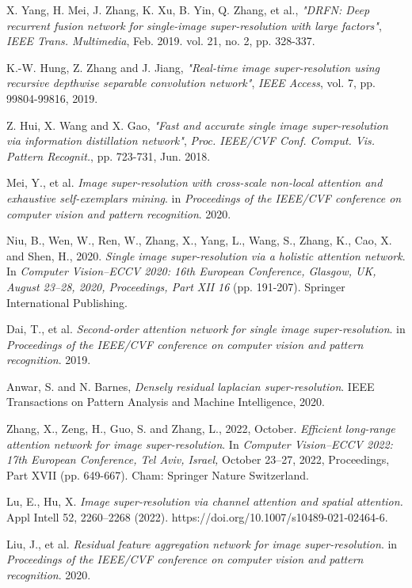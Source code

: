 \documentclass{ieeeaccess}
\begin{document}
\begin{thebibliography}{00}
 X. Yang, H. Mei, J. Zhang, K. Xu, B. Yin, Q. Zhang, et al., \textit{"DRFN: Deep recurrent fusion network for single-image super-resolution with large factors"}, \textit{IEEE Trans. Multimedia}, Feb. 2019. vol. 21, no. 2, pp. 328-337.

 K.-W. Hung, Z. Zhang and J. Jiang, \textit{"Real-time image super-resolution using recursive depthwise separable convolution network"}, \textit{IEEE Access}, vol. 7, pp. 99804-99816, 2019.

 Z. Hui, X. Wang and X. Gao, \textit{"Fast and accurate single image super-resolution via information distillation network"}, \textit{Proc. IEEE/CVF Conf. Comput. Vis. Pattern Recognit.}, pp. 723-731, Jun. 2018.

 Mei, Y., et al. \textit{Image super-resolution with cross-scale non-local attention and exhaustive self-exemplars mining}. in \textit{Proceedings of the IEEE/CVF conference on computer vision and pattern recognition}. 2020.

 Niu, B., Wen, W., Ren, W., Zhang, X., Yang, L., Wang, S., Zhang, K., Cao, X. and Shen, H., 2020. \textit{Single image super-resolution via a holistic attention network}. In \textit{Computer Vision–ECCV 2020: 16th European Conference, Glasgow, UK, August 23–28, 2020, Proceedings, Part XII 16} (pp. 191-207). Springer International Publishing.

 Dai, T., et al. \textit{Second-order attention network for single image super-resolution}. in \textit{Proceedings of the IEEE/CVF conference on computer vision and pattern recognition}. 2019.

 Anwar, S. and N. Barnes, \textit{Densely residual laplacian super-resolution}. IEEE Transactions on Pattern Analysis and Machine Intelligence, 2020.

 Zhang, X., Zeng, H., Guo, S. and Zhang, L., 2022, October. \textit{Efficient long-range attention network for image super-resolution}. In \textit{Computer Vision–ECCV 2022: 17th European Conference, Tel Aviv, Israel,} October 23–27, 2022, Proceedings, Part XVII (pp. 649-667). Cham: Springer Nature Switzerland.

 Lu, E., Hu, X. \textit{Image super-resolution via channel attention and spatial attention.} Appl Intell 52, 2260–2268 (2022). https://doi.org/10.1007/s10489-021-02464-6.


 Liu, J., et al. \textit{Residual feature aggregation network for image super-resolution}. in \textit{Proceedings of the IEEE/CVF conference on computer vision and pattern recognition}. 2020.


\end{thebibliography}
\end{document}

